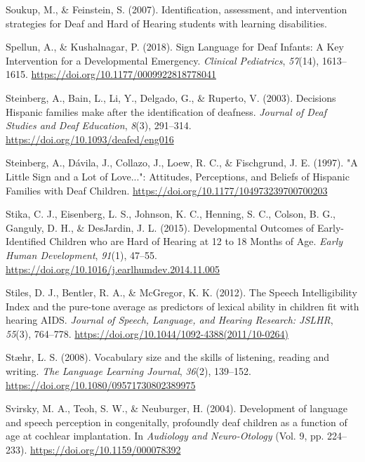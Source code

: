 \documentclass[english,man]{apa6}
\begin{document}
\leavevmode\hypertarget{ref-soukup2007}{}%
Soukup, M., \& Feinstein, S. (2007). Identification, assessment, and intervention strategies for Deaf and Hard of Hearing students with learning disabilities.

\leavevmode\hypertarget{ref-spellun2018}{}%
Spellun, A., \& Kushalnagar, P. (2018). Sign Language for Deaf Infants: A Key Intervention for a Developmental Emergency. \emph{Clinical Pediatrics}, \emph{57}(14), 1613--1615. \url{https://doi.org/10.1177/0009922818778041}

\leavevmode\hypertarget{ref-steinberg2003}{}%
Steinberg, A., Bain, L., Li, Y., Delgado, G., \& Ruperto, V. (2003). Decisions Hispanic families make after the identification of deafness. \emph{Journal of Deaf Studies and Deaf Education}, \emph{8}(3), 291--314. \url{https://doi.org/10.1093/deafed/eng016}

\leavevmode\hypertarget{ref-steinberg1997}{}%
Steinberg, A., Dávila, J., Collazo, J., Loew, R. C., \& Fischgrund, J. E. (1997). "A Little Sign and a Lot of Love...": Attitudes, Perceptions, and Beliefs of Hispanic Families with Deaf Children. \url{https://doi.org/10.1177/104973239700700203}

\leavevmode\hypertarget{ref-stika2015}{}%
Stika, C. J., Eisenberg, L. S., Johnson, K. C., Henning, S. C., Colson, B. G., Ganguly, D. H., \& DesJardin, J. L. (2015). Developmental Outcomes of Early-Identified Children who are Hard of Hearing at 12 to 18 Months of Age. \emph{Early Human Development}, \emph{91}(1), 47--55. \url{https://doi.org/10.1016/j.earlhumdev.2014.11.005}

\leavevmode\hypertarget{ref-stiles2012}{}%
Stiles, D. J., Bentler, R. A., \& McGregor, K. K. (2012). The Speech Intelligibility Index and the pure-tone average as predictors of lexical ability in children fit with hearing AIDS. \emph{Journal of Speech, Language, and Hearing Research: JSLHR}, \emph{55}(3), 764--778. \url{https://doi.org/10.1044/1092-4388(2011/10-0264)}

\leavevmode\hypertarget{ref-staehr2008}{}%
Stæhr, L. S. (2008). Vocabulary size and the skills of listening, reading and writing. \emph{The Language Learning Journal}, \emph{36}(2), 139--152. \url{https://doi.org/10.1080/09571730802389975}

\leavevmode\hypertarget{ref-svirsky2004}{}%
Svirsky, M. A., Teoh, S. W., \& Neuburger, H. (2004). Development of language and speech perception in congenitally, profoundly deaf children as a function of age at cochlear implantation. In \emph{Audiology and Neuro-Otology} (Vol. 9, pp. 224--233). \url{https://doi.org/10.1159/000078392}
\end{document}
